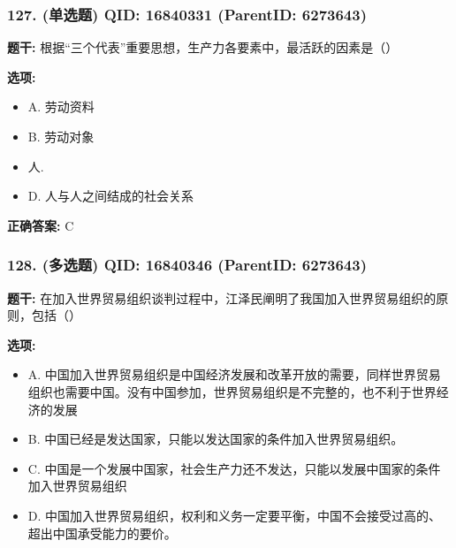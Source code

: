 \documentclass[12pt,UTF8]{ctexart}
\begin{document}
\subsubsection*{127. (单选题) \small QID: 16840331 (ParentID: 6273643)}

\textbf{题干:}
根据“三个代表”重要思想，生产力各要素中，最活跃的因素是（）



\textbf{选项:}
\begin{itemize}[leftmargin=*]

  \item A. 劳动资料

  \item B. 劳动对象

  \item 人. 

  \item D. 人与人之间结成的社会关系

\end{itemize}

\textbf{正确答案:}
C

\vspace{0.3em}\hrulefill\vspace{0.7em}

\subsubsection*{128. (多选题) \small QID: 16840346 (ParentID: 6273643)}

\textbf{题干:}
在加入世界贸易组织谈判过程中，江泽民阐明了我国加入世界贸易组织的原则，包括（）



\textbf{选项:}
\begin{itemize}[leftmargin=*]

  \item A. 中国加入世界贸易组织是中国经济发展和改革开放的需要，同样世界贸易组织也需要中国。没有中国参加，世界贸易组织是不完整的，也不利于世界经济的发展

  \item B. 中国已经是发达国家，只能以发达国家的条件加入世界贸易组织。

  \item C. 中国是一个发展中国家，社会生产力还不发达，只能以发展中国家的条件加入世界贸易组织

  \item D. 中国加入世界贸易组织，权利和义务一定要平衡，中国不会接受过高的、超出中国承受能力的要价。

\end{itemize}
\end{document}
